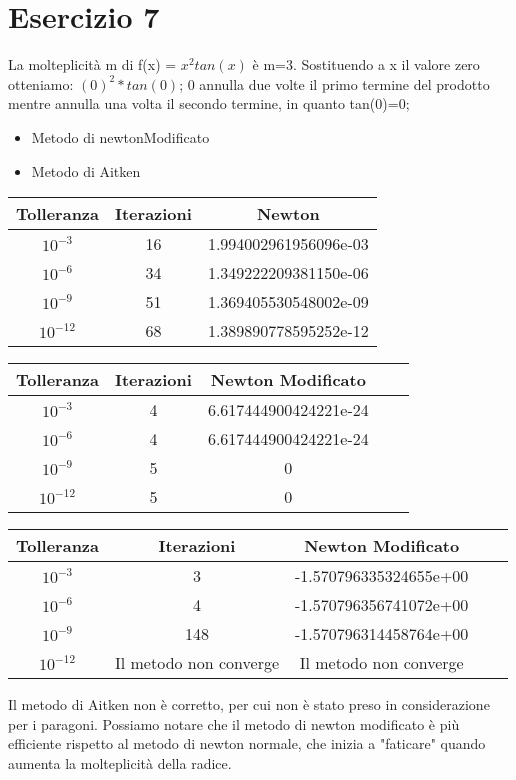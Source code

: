 \section{Esercizio 7}
La molteplicità m di f(x) = $x^2tan(x)$ è m=3. Sostituendo a x il valore zero otteniamo: $(0)^2*tan(0)$; 0 annulla due volte il primo termine del prodotto mentre annulla una volta il secondo termine, in quanto tan(0)=0;

\begin{itemize}
    \item Metodo di newtonModificato
    
    \item Metodo di Aitken
    
  
\end{itemize}


\begin{table}[ht]
	\centering
	\small
	\begin{tabular}{| c | c | c |}
	\hline
	Tolleranza & Iterazioni & Newton\\
	\hline
	 $10^{-3}$  &16 & 1.994002961956096e-03 \\
	\hline
	$10^{-6}$ & 34&1.349222209381150e-06 \\
	\hline
	$10^{-9}$ &51& 1.369405530548002e-09 \\
	\hline
	$10^{-12}$ & 68 & 1.389890778595252e-12 \\
	\hline
	\end{tabular}
\end{table}


\begin{table}[ht]
	\centering
	\small
	\begin{tabular}{| c | c | c | c | c|}
	\hline
	Tolleranza & Iterazioni & Newton Modificato \\
	\hline
	 $10^{-3}$  & 4 & 6.617444900424221e-24 \\
	\hline
	$10^{-6}$ & 4 & 6.617444900424221e-24 \\
	\hline
	$10^{-9}$ &  5 & 0 \\
	\hline
	$10^{-12}$ & 5 &  0\\
	\hline
	\end{tabular}
\end{table}

\begin{table}[ht]
	\centering
	\small
	\begin{tabular}{| c | c | c | c | c|}
	\hline
	Tolleranza & Iterazioni & Newton Modificato \\
	\hline
	 $10^{-3}$  & 3 &-1.570796335324655e+00 \\
	\hline
	$10^{-6}$ & 4 & -1.570796356741072e+00 \\
	\hline
	$10^{-9}$ & 148 &  -1.570796314458764e+00\\
	\hline
	$10^{-12}$ & Il metodo non converge &  Il metodo non converge\\
	\hline
	\end{tabular}
\end{table}

Il metodo di Aitken non è corretto, per cui non è stato preso in considerazione per i paragoni. Possiamo notare che il metodo di newton modificato è più efficiente rispetto al metodo di newton  normale, che inizia a "faticare" quando aumenta la molteplicità della radice.